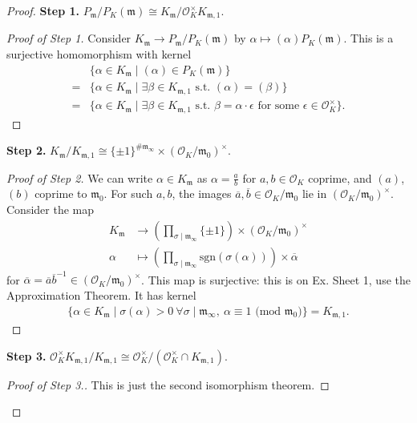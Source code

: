 \documentclass{article}
\theoremstyle{definition}
\begin{document}
\begin{proof}
    \textbf{Step 1.} $P_{\mathfrak{m}}/P_K(\mathfrak{m}) \cong K_{\mathfrak{m}}/\mathcal{O}_K^\times K_{\mathfrak{m},1}$.
    \begin{proof}[Proof of Step 1]
        Consider $K_{\mathfrak{m}} \to P_{\mathfrak{m}}/P_K(\mathfrak{m})$ by $\alpha \mapsto (\alpha)P_K(\mathfrak{m})$. This is a surjective homomorphism with kernel 
        \begin{align*}
            &\{\alpha \in K_{\mathfrak{m}}\mid  (\alpha) \in P_K(\mathfrak{m})\} \\
            =& \{\alpha \in K_{\mathfrak{m}} \mid \exists \beta \in K_{\mathfrak{m},1} \text{ s.t. }(\alpha)=(\beta)\} \\
            =& \{\alpha \in K_{\mathfrak{m}} \mid \exists \beta \in K_{\mathfrak{m},1} \text{ s.t. }\beta = \alpha\cdot \epsilon \text{ for some }\epsilon \in \mathcal{O}_K^\times\}.
        \end{align*}
    \end{proof}
    \textbf{Step 2.} $K_{\mathfrak{m}}/K_{\mathfrak{m},1} \cong \{\pm 1\}^{\# \mathfrak{m}_{\infty}} \times (\mathcal{O}_K/\mathfrak{m}_0)^\times$.
    \begin{proof}[Proof of Step 2]
        We can write $\alpha \in K_{\mathfrak{m}}$ as $\alpha = \frac{a}{b}$ for $a,b \in \mathcal{O}_K$ coprime, and $(a)$, $(b)$ coprime to $\mathfrak{m}_0$. For such $a,b$, the images $\overline{a},\overline{b} \in \mathcal{O}_K/\mathfrak{m}_0$ lie in $(\mathcal{O}_K/\mathfrak{m}_0)^\times$. Consider the map 
        \begin{align*}
            K_{\mathfrak{m}} &\to \left( \prod_{\sigma \mid \mathfrak{m}_{\infty}}^{} \{\pm 1\}\right) \times (\mathcal{O}_K/\mathfrak{m}_0)^\times\\
            \alpha &\mapsto \left(\prod_{\sigma \mid \mathfrak{m}_{\infty}}^{} \text{sgn}(\sigma(\alpha)) \right) \times \overline{\alpha}
        \end{align*}
        for $\overline{\alpha} = \overline{a} \overline{b}^{-1} \in (\mathcal{O}_K/\mathfrak{m}_0)^\times$. This map is surjective: this is on Ex. Sheet 1, use the Approximation Theorem. It has kernel 
        \begin{align*}
            \{\alpha \in K_{\mathfrak{m}}\mid \sigma(\alpha) > 0 ~\forall \sigma \mid \mathfrak{m}_{\infty}, ~\alpha \equiv 1 \text{ (mod }\mathfrak{m}_0)\} = K_{\mathfrak{m},1}.
        \end{align*}
    \end{proof}
    \textbf{Step 3.} $\mathcal{O}_K^\times K_{\mathfrak{m},1}/K_{\mathfrak{m},1} \cong \mathcal{O}_K^\times/(\mathcal{O}_K^\times \cap K_{\mathfrak{m},1})$.
    \begin{proof}[Proof of Step 3.]
        This is just the second isomorphism theorem.
    \end{proof}
    \vspace{1mm}
     

\end{proof}
\end{document}
